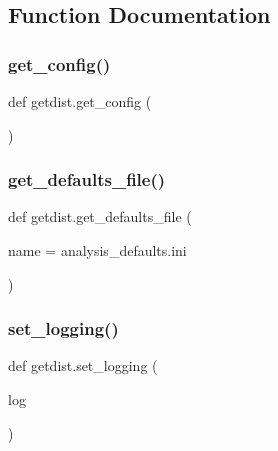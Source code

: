 \subsection{Function Documentation}
\mbox{\label{namespacegetdist_ae1cef30c152a1bd4e44ee539fd21c3db}} 
\subsubsection{\texorpdfstring{get\+\_\+config()}{get\_config()}}
{\footnotesize\ttfamily def getdist.\+get\+\_\+config (\begin{DoxyParamCaption}{ }\end{DoxyParamCaption})}

\mbox{\label{namespacegetdist_af1887c8e2da86996dd314d3cecb257dc}} 
\subsubsection{\texorpdfstring{get\+\_\+defaults\+\_\+file()}{get\_defaults\_file()}}
{\footnotesize\ttfamily def getdist.\+get\+\_\+defaults\+\_\+file (\begin{DoxyParamCaption}\item[{}]{name = {\ttfamily \textquotesingle{}analysis\+\_\+defaults.ini\textquotesingle{}} }\end{DoxyParamCaption})}

\mbox{\label{namespacegetdist_afff37f2d5a620eda2304d8daa72351c0}} 
\subsubsection{\texorpdfstring{set\+\_\+logging()}{set\_logging()}}
{\footnotesize\ttfamily def getdist.\+set\+\_\+logging (\begin{DoxyParamCaption}\item[{}]{log }\end{DoxyParamCaption})}




